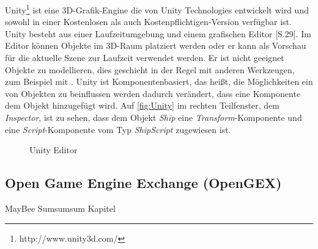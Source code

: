 Unity\footnote{http://www.unity3d.com/} ist eine 3D-Grafik-Engine die von Unity Technologies entwickelt wird und sowohl in einer Kostenlosen als auch Kostenpflichtigen-Version verfügbar ist. Unity besteht aus einer Laufzeitumgebung und einem grafischen Editor \cite{Gregory.2014}[S.29]. Im Editor können Objekte im 3D-Raum platziert werden oder er kann als Vorschau für die aktuelle Szene zur Laufzeit verwendet werden. Er ist nicht geeignet Objekte zu modellieren, dies geschieht in der Regel mit anderen Werkzeugen, zum Beispiel mit .
Unity ist Komponentenbasiert, das heißt, die Möglichkeiten ein von Objekten zu beinflussen werden dadurch verändert, dass eine Komponente dem Objekt hinzugefügt wird. Auf \autoref{fig:Unity} im rechten Teilfenster, dem \emph{Inspector}, ist zu sehen, dass dem Objekt \emph{Ship} eine \emph{Transform}-Komponente und eine \emph{Script}-Komponente vom Typ \emph{ShipScript} zugewiesen ist.

\begin{figure}[htbp]
  \centering
  \caption{Unity Editor}
  \label{fig:Unity}
\end{figure}

\subsection{Open Game Engine Exchange (OpenGEX)}
\label{sec:OpenGEX}

MayBee Sumsumsum Kapitel